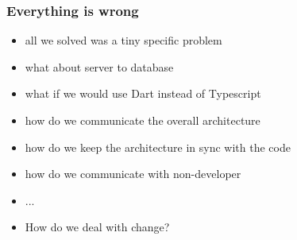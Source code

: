 \documentclass[xelatex,13pt]{beamer}
\begin{document}
\begin{frame}
	\frametitle{Everything is wrong}
	\begin{itemize}
		\item all we solved was a tiny specific problem
		\item what about server to database
		\item what if we would use Dart instead of Typescript
		\item how do we communicate the overall architecture
		\item how do we keep the architecture in sync with the code
		\item how do we communicate with non-developer
		\item ...
		\pause
		\item {\huge How do we deal with change?}
	\end{itemize}
\end{frame}
\end{document}
